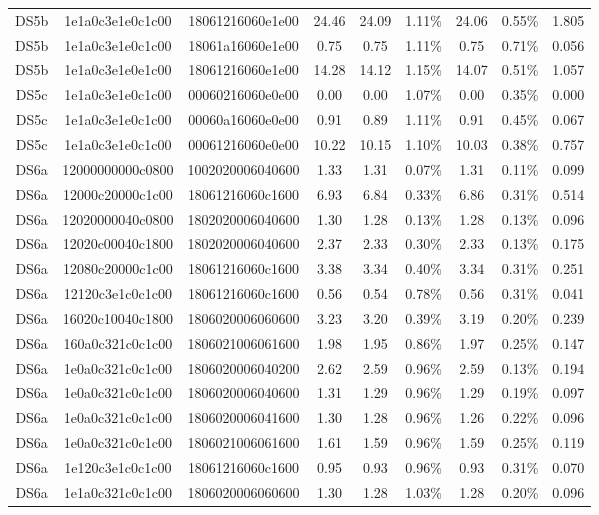 \begin{tabular}{|c|c c|c|c c|c c|c|}
  DS5b & 1e1a0c3e1e0c1c00 & 18061216060e1e00 & 24.46 & 24.09 & 1.11\% & 24.06 & 0.55\% & 1.805 \\
  DS5b & 1e1a0c3e1e0c1c00 & 18061a16060e1e00 & 0.75 & 0.75 & 1.11\% & 0.75 & 0.71\% & 0.056 \\
  DS5b & 1e1a0c3e1e0e1c00 & 18061216060e1e00 & 14.28 & 14.12 & 1.15\% & 14.07 & 0.51\% & 1.057 \\
  DS5c & 1e1a0c3e1e0c1c00 & 00060216060e0e00 & 0.00 & 0.00 & 1.07\% & 0.00 & 0.35\% & 0.000 \\
  DS5c & 1e1a0c3e1e0c1c00 & 00060a16060e0e00 & 0.91 & 0.89 & 1.11\% & 0.91 & 0.45\% & 0.067 \\
  DS5c & 1e1a0c3e1e0c1c00 & 00061216060e0e00 & 10.22 & 10.15 & 1.10\% & 10.03 & 0.38\% & 0.757 \\
  DS6a & 12000000000c0800 & 1002020006040600 & 1.33 & 1.31 & 0.07\% & 1.31 & 0.11\% & 0.099 \\
  DS6a & 12000c20000c1c00 & 18061216060c1600 & 6.93 & 6.84 & 0.33\% & 6.86 & 0.31\% & 0.514 \\
  DS6a & 12020000040c0800 & 1802020006040600 & 1.30 & 1.28 & 0.13\% & 1.28 & 0.13\% & 0.096 \\
  DS6a & 12020c00040c1800 & 1802020006040600 & 2.37 & 2.33 & 0.30\% & 2.33 & 0.13\% & 0.175 \\
  DS6a & 12080c20000c1c00 & 18061216060c1600 & 3.38 & 3.34 & 0.40\% & 3.34 & 0.31\% & 0.251 \\
  DS6a & 12120c3e1c0c1c00 & 18061216060c1600 & 0.56 & 0.54 & 0.78\% & 0.56 & 0.31\% & 0.041 \\
  DS6a & 16020c10040c1800 & 1806020006060600 & 3.23 & 3.20 & 0.39\% & 3.19 & 0.20\% & 0.239 \\
  DS6a & 160a0c321c0c1c00 & 1806021006061600 & 1.98 & 1.95 & 0.86\% & 1.97 & 0.25\% & 0.147 \\
  DS6a & 1e0a0c321c0c1c00 & 1806020006040200 & 2.62 & 2.59 & 0.96\% & 2.59 & 0.13\% & 0.194 \\
  DS6a & 1e0a0c321c0c1c00 & 1806020006040600 & 1.31 & 1.29 & 0.96\% & 1.29 & 0.19\% & 0.097 \\
  DS6a & 1e0a0c321c0c1c00 & 1806020006041600 & 1.30 & 1.28 & 0.96\% & 1.26 & 0.22\% & 0.096 \\
  DS6a & 1e0a0c321c0c1c00 & 1806021006061600 & 1.61 & 1.59 & 0.96\% & 1.59 & 0.25\% & 0.119 \\
  DS6a & 1e120c3e1c0c1c00 & 18061216060c1600 & 0.95 & 0.93 & 0.96\% & 0.93 & 0.31\% & 0.070 \\
  DS6a & 1e1a0c321c0c1c00 & 1806020006060600 & 1.30 & 1.28 & 1.03\% & 1.28 & 0.20\% & 0.096 \\

\end{tabular}
